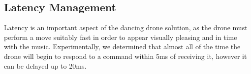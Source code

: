 \subsection{Latency Management}


Latency is an important aspect of the dancing drone solution, as the drone must perform a move suitably fast in
order to appear visually pleasing and in time with the music. Experimentally, we determined that almost all of
the time the drone will begin to respond to a command within 5ms of receiving it, however it can be delayed up to
20ms.
